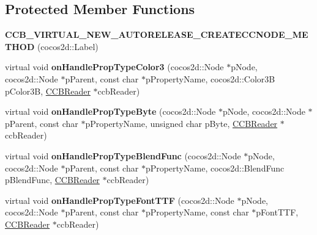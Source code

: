 \subsection*{Protected Member Functions}
\begin{DoxyCompactItemize}
\item 
\mbox{\label{classcocosbuilder_1_1LabelTTFLoader_aceb2c5750bedbb613954a1a1d4eb6f63}} 
{\bfseries C\+C\+B\+\_\+\+V\+I\+R\+T\+U\+A\+L\+\_\+\+N\+E\+W\+\_\+\+A\+U\+T\+O\+R\+E\+L\+E\+A\+S\+E\+\_\+\+C\+R\+E\+A\+T\+E\+C\+C\+N\+O\+D\+E\+\_\+\+M\+E\+T\+H\+OD} (cocos2d\+::\+Label)
\item 
\mbox{\label{classcocosbuilder_1_1LabelTTFLoader_a81674c22e7510dcf4909d3214feef650}} 
virtual void {\bfseries on\+Handle\+Prop\+Type\+Color3} (cocos2d\+::\+Node $\ast$p\+Node, cocos2d\+::\+Node $\ast$p\+Parent, const char $\ast$p\+Property\+Name, cocos2d\+::\+Color3B p\+Color3B, \hyperlink{classcocosbuilder_1_1CCBReader}{C\+C\+B\+Reader} $\ast$ccb\+Reader)
\item 
\mbox{\label{classcocosbuilder_1_1LabelTTFLoader_a42b9f24587b4f73ea764bda77a72d4c0}} 
virtual void {\bfseries on\+Handle\+Prop\+Type\+Byte} (cocos2d\+::\+Node $\ast$p\+Node, cocos2d\+::\+Node $\ast$p\+Parent, const char $\ast$p\+Property\+Name, unsigned char p\+Byte, \hyperlink{classcocosbuilder_1_1CCBReader}{C\+C\+B\+Reader} $\ast$ccb\+Reader)
\item 
\mbox{\label{classcocosbuilder_1_1LabelTTFLoader_a63c4ba843a467dd4d108661d5994ad72}} 
virtual void {\bfseries on\+Handle\+Prop\+Type\+Blend\+Func} (cocos2d\+::\+Node $\ast$p\+Node, cocos2d\+::\+Node $\ast$p\+Parent, const char $\ast$p\+Property\+Name, cocos2d\+::\+Blend\+Func p\+Blend\+Func, \hyperlink{classcocosbuilder_1_1CCBReader}{C\+C\+B\+Reader} $\ast$ccb\+Reader)
\item 
\mbox{\label{classcocosbuilder_1_1LabelTTFLoader_ad6d5e56ea7474a43dc4881dd87383554}} 
virtual void {\bfseries on\+Handle\+Prop\+Type\+Font\+T\+TF} (cocos2d\+::\+Node $\ast$p\+Node, cocos2d\+::\+Node $\ast$p\+Parent, const char $\ast$p\+Property\+Name, const char $\ast$p\+Font\+T\+TF, \hyperlink{classcocosbuilder_1_1CCBReader}{C\+C\+B\+Reader} $\ast$ccb\+Reader)

\end{DoxyCompactItemize}
